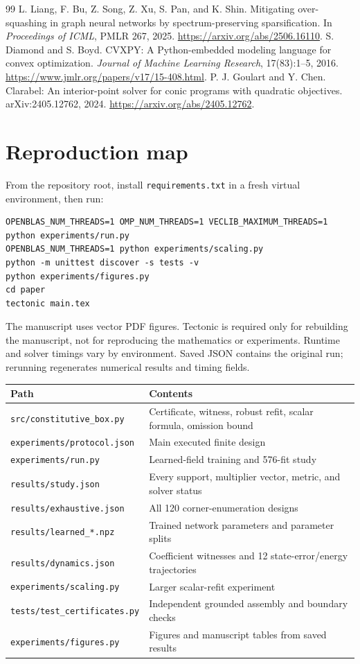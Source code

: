 \documentclass[11pt]{article}
\begin{document}
\begin{thebibliography}{99}
 L. Liang, F. Bu, Z. Song, Z. Xu, S. Pan, and K. Shin. Mitigating over-squashing in graph neural networks by spectrum-preserving sparsification. In \emph{Proceedings of ICML}, PMLR 267, 2025. \url{https://arxiv.org/abs/2506.16110}.
 S. Diamond and S. Boyd. CVXPY: A Python-embedded modeling language for convex optimization. \emph{Journal of Machine Learning Research}, 17(83):1--5, 2016. \url{https://www.jmlr.org/papers/v17/15-408.html}.
 P. J. Goulart and Y. Chen. Clarabel: An interior-point solver for conic programs with quadratic objectives. arXiv:2405.12762, 2024. \url{https://arxiv.org/abs/2405.12762}.
\end{thebibliography}

\appendix
\section{Reproduction map}
From the repository root, install \texttt{requirements.txt} in a fresh virtual environment, then run:
\begin{lstlisting}
OPENBLAS_NUM_THREADS=1 OMP_NUM_THREADS=1 VECLIB_MAXIMUM_THREADS=1 python experiments/run.py
OPENBLAS_NUM_THREADS=1 python experiments/scaling.py
python -m unittest discover -s tests -v
python experiments/figures.py
cd paper
tectonic main.tex
\end{lstlisting}
The manuscript uses vector PDF figures. Tectonic is required only for rebuilding the manuscript, not for reproducing the mathematics or experiments. Runtime and solver timings vary by environment. Saved JSON contains the original run; rerunning regenerates numerical results and timing fields.

\begin{center}\small
\begin{tabular}{p{.42\linewidth}p{.48\linewidth}}\toprule
Path & Contents\\\midrule
\texttt{src/constitutive\_box.py} & Certificate, witness, robust refit, scalar formula, omission bound\\
\texttt{experiments/protocol.json} & Main executed finite design\\
\texttt{experiments/run.py} & Learned-field training and 576-fit study\\
\texttt{results/study.json} & Every support, multiplier vector, metric, and solver status\\
\texttt{results/exhaustive.json} & All 120 corner-enumeration designs\\
\texttt{results/learned\_*.npz} & Trained network parameters and parameter splits\\
\texttt{results/dynamics.json} & Coefficient witnesses and 12 state-error/energy trajectories\\
\texttt{experiments/scaling.py} & Larger scalar-refit experiment\\
\texttt{tests/test\_certificates.py} & Independent grounded assembly and boundary checks\\
\texttt{experiments/figures.py} & Figures and manuscript tables from saved results\\\bottomrule
\end{tabular}
\end{center}
\end{document}
